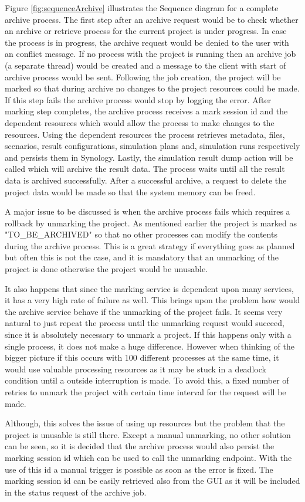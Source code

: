 Figure \ref{fig:sequenceArchive} illustrates the Sequence diagram for a complete archive process. The first step after an archive request would be to check
whether an archive or retrieve process for the current project is under progress. In case the process is in progress, the archive request would be denied to the
user with an conflict message. If no process with the project is running then an archive job (a separate thread) would be created and a message to the client with start of archive process would be
sent. Following the job creation, the project will be marked so that during archive no changes to the project resources could be made. If this step fails the archive 
process would stop by logging the error. After marking step completes, the archive process receives a mark session id and the dependent resources which would allow the process to make
changes to the resources. Using the dependent resources the process retrieves metadata, files, scenarios, result configurations, simulation plans and, simulation runs 
respectively and persists them in Synology. Lastly, the simulation result dump action will be called which will archive the result data. The process waits until
all the result data is archived successfully. After a successful archive, a request to delete the project data would be made so that the system memory can be freed.

A major issue to be discussed is when the archive process fails which requires a rollback by unmarking the project. As mentioned earlier the project is
marked as "TO\_BE\_ARCHIVED" so that no other processes can modify the contents during the archive process. This is a great strategy if everything goes as planned but 
often this is not the case, and it is mandatory that an unmarking of the project is done otherwise the project would be unusable. 

It also happens that since the
marking service is dependent upon many services, it has a very high rate of failure as well. This brings upon the problem how would the archive service behave if the
unmarking of the project fails. It seems very natural to just repeat the process until the unmarking request would succeed, since it is absolutely necessary to unmark
a project. If this happens only with a single process, it does not make a huge difference. However when thinking of the bigger picture if this 
occurs with 100 different processes at the same time, it would use valuable processing resources as it may be stuck in a deadlock condition until a outside interruption
is made. To avoid this, a fixed number of retries to unmark the project with certain time interval for the request 
will be made. 

Although, this solves the issue of using up resources but the problem that the project is unusable is still there. Except a manual unmarking, no other solution 
can be seen, so 
it is decided that the archive process would also persist the marking session id which can be used to call the unmarking endpoint. With the use of this id a manual 
trigger is possible as soon as the error is fixed. The marking session id can be easily retrieved also from the GUI as it will be included in the status request of
the archive job.
 